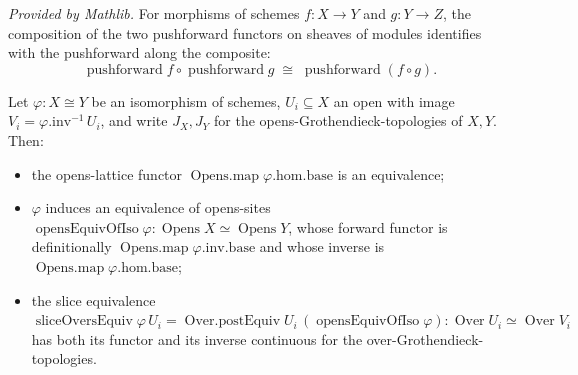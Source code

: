 \begin{lemma}
  \label{lem:scheme_pushforwardComp_mathlib}
  \mathlibok
  \textit{Provided by Mathlib.}
  For morphisms of schemes \(f : X \to Y\) and \(g : Y \to Z\), the composition of the two
  pushforward functors on sheaves of modules identifies with the pushforward along the composite:
  \[
    \operatorname{pushforward} f \circ \operatorname{pushforward} g
      \;\cong\; \operatorname{pushforward}(f \circ g).
  \]
\end{lemma}

\begin{lemma}
  \label{lem:slice_overs_equiv_continuity}
  Let \(\varphi : X \cong Y\) be an isomorphism of schemes, \(U_i \subseteq X\) an open with image
  \(V_i = \varphi.\mathrm{inv}^{-1}\,U_i\), and write \(J_X, J_Y\) for the opens-Grothendieck-topologies
  of \(X, Y\). Then:
  \begin{itemize}
    \item the opens-lattice functor \(\operatorname{Opens.map}\varphi.\mathrm{hom}.\mathrm{base}\) is an
      equivalence;
    \item \(\varphi\) induces an equivalence of opens-sites \(\operatorname{opensEquivOfIso}\varphi :
      \operatorname{Opens} X \simeq \operatorname{Opens} Y\), whose forward functor is definitionally
      \(\operatorname{Opens.map}\varphi.\mathrm{inv}.\mathrm{base}\) and whose inverse is
      \(\operatorname{Opens.map}\varphi.\mathrm{hom}.\mathrm{base}\);
    \item the slice equivalence \(\operatorname{sliceOversEquiv}\varphi\,U_i = \operatorname{Over.postEquiv}
      U_i\,(\operatorname{opensEquivOfIso}\varphi) : \operatorname{Over} U_i \simeq \operatorname{Over} V_i\)
      has both its functor and its inverse continuous for the over-Grothendieck-topologies.
  \end{itemize}
\end{lemma}
